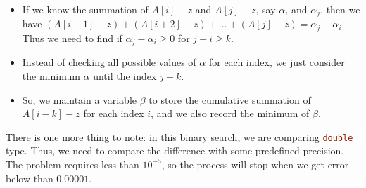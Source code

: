 \begin{itemize}
\item If we know the summation of $A[i]-z$ and $A[j]-z$, say $\alpha_i$ and $\alpha_j$, then we have $(A[i+1]-z) + (A[i+2]-z)+\ldots+(A[j]-z) = \alpha_j - \alpha_i$. Thus we need to find if $\alpha_j - \alpha_i\geq 0 $ for $j-i \geq k$.
\item Instead of checking all possible values of $\alpha$ for each index, we just consider the minimum $\alpha$ until the index $j-k$. 
\item So, we maintain a variable $\beta$ to store the cumulative summation of $A[i-k]-z$ for each index $i$, and we also record the minimum of $\beta$.
\end{itemize}

There is one more thing to note: in this binary search, we are comparing \lstinline[language=Java, basicstyle=\small\ttfamily, keywordstyle=\bfseries\color{green!40!black}]|double| type. Thus, we need to compare the difference with some predefined precision. The problem requires less than $10^{-5}$, so the process will stop when we get error below than $0.00001$.
